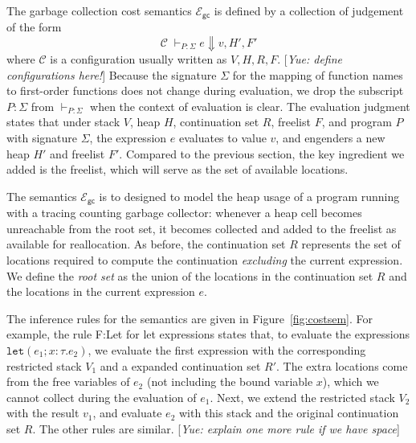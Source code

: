 \documentclass{easychair}
\newcommand{\ms}[1]{\ensuremath{\mathsf{#1}}}
\newcommand{\irl}[1]{\mathtt{#1}}
\newcounter{rule}
\newcommand{\yue}[1]{{\color{blue} [\emph{Yue: #1}]}}
\newcommand{\gcSem}{\ensuremath{\mathcal{E}_{\ms{gc}}}}
\theoremstyle{definition}
\begin{document}
The garbage collection cost semantics \gcSem{} is defined by a collection of judgement of the form
\[
\mathcal{C} \; \vdash_{P : \Sigma} e \Downarrow v, H', F'
\]
where $\mathcal{C}$ is a configuration usually written as $V,H,R,F$. \yue{define configurations here!}
Because the signature $\Sigma$ for the mapping of function names to first-order functions 
does not change during evaluation, we drop the subscript $P:\Sigma$ from $\vdash_{P:\Sigma}$ 
when the context of evaluation is clear.
The evaluation judgment states that under stack $V$, heap $H$, continuation set $R$,
freelist $F$, and program $P$ with signature $\Sigma$, the expression $e$ evaluates to value $v$, 
and engenders a new heap $H'$ and freelist $F'$. Compared to the previous section, the key
ingredient we added is the freelist, which will serve as the set of available 
locations.

The semantics \gcSem{} is to designed to model the heap usage of a program running with a 
tracing counting garbage collector: whenever a heap cell becomes unreachable from the 
root set, it becomes collected and added to the freelist as available for reallocation.
As before, the continuation set $R$ represents the set of locations 
required to compute the continuation \emph{excluding} the current expression.
We define the  \emph{root set} as the union of the locations in the continuation set $R$ 
and the locations in the current expression $e$. 

The inference rules for the semantics are given in Figure~\ref{fig:costsem}.
For example, the rule F:Let for let expressions
states that, to evaluate the expressions $\irl{let}(e_1; x {:} \tau.e_2)$, we evaluate the first 
expression with the corresponding restricted stack $V_1$ and a expanded continuation set $R'$. 
The extra locations come from the free variables of $e_2$ (not including the bound variable $x$),
which we cannot collect during the evaluation of $e_1$. Next, we extend the restricted stack 
$V_2$ with the result $v_1$, and evaluate $e_2$ with this stack and the original continuation 
set $R$. The other rules are similar. \yue{explain one more rule if we have space}
\end{document}
